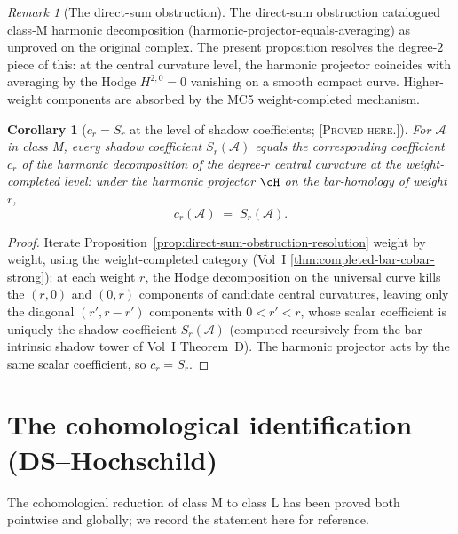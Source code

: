 \documentclass[11pt]{amsart}
\newtheorem{corollary}[theorem]{Corollary}
\theoremstyle{definition}
\theoremstyle{remark}
\newtheorem{remark}[theorem]{Remark}
\providecommand{\cA}{\mathcal{A}}
\providecommand{\ClaimStatusProvedHere}{\textsc{[Proved here.]}}
\begin{document}
\begin{remark}[The direct-sum obstruction]
The direct-sum obstruction catalogued class-M harmonic decomposition
(harmonic-projector-equals-averaging) as unproved on the original
complex. The present proposition resolves the degree-$2$ piece of
this: at the central curvature level, the harmonic projector
coincides with averaging by the Hodge $H^{2,0} = 0$ vanishing on a
smooth compact curve. Higher-weight components are absorbed by the
MC5 weight-completed mechanism.
\end{remark}

\begin{corollary}[$c_r = S_r$ at the level of shadow coefficients;
\ClaimStatusProvedHere]%
\label{cor:cr-equals-Sr}%
For $\cA$ in class M, every shadow coefficient $S_r(\cA)$ equals the
corresponding coefficient $c_r$ of the harmonic decomposition of the
degree-$r$ central curvature at the weight-completed level: under
the harmonic projector $\cH$ on the bar-homology of weight $r$,
\[
  c_r(\cA) \;=\; S_r(\cA).
\]
\end{corollary}

\begin{proof}
Iterate Proposition~\ref{prop:direct-sum-obstruction-resolution} weight by weight,
using the weight-completed category (Vol~I
\ref*{thm:completed-bar-cobar-strong}): at each weight $r$, the
Hodge decomposition on the universal curve kills the $(r, 0)$ and
$(0, r)$ components of candidate central curvatures, leaving only
the diagonal $(r', r-r')$ components with $0 < r' < r$, whose
scalar coefficient is uniquely the shadow coefficient $S_r(\cA)$
(computed recursively from the bar-intrinsic shadow tower of
Vol~I Theorem~D). The harmonic projector acts by the same
scalar coefficient, so $c_r = S_r$.
\end{proof}

\section{The cohomological identification (DS--Hochschild)}
\label{sec:DS-Hochschild-cohom}

The cohomological reduction of class M to class L has been proved
both pointwise and globally; we record the statement here for
reference.
\end{document}
